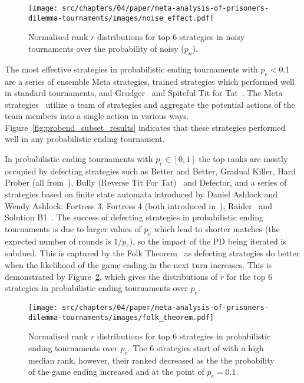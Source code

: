 \begin{figure}[!htbp]
    \centering
    \texttt{[image: src/chapters/04/paper/meta-analysis-of-prisoners-dilemma-tournaments/images/noise\_effect.pdf]}
    \caption{Normalised rank \(r\) distributions for top 6 strategies in noisy tournaments over
    the probability of noisy ($p_n$).}
    \label{fig:effect_of_noise}
\end{figure}

The most effective strategies in probabilistic ending
tournaments with \(p_e< 0.1\) are a series of ensemble Meta strategies, trained strategies
which performed well
in standard tournaments, and Grudger~\cite{axelrodproject} and Spiteful Tit for
Tat~\cite{prison}. The Meta strategies~\cite{axelrodproject} utilize a team of
strategies and aggregate the potential actions of the team members into a single action
in various ways. Figure~\ref{fig:probend_subset_results} indicates that these strategies
performed well in any probabilistic ending tournament.

In probabilistic ending tournaments with \(p_e \in [0, 1]\) the top ranks are
mostly occupied by defecting strategies such as Better and Better, Gradual
Killer, Hard Prober (all from~\cite{axelrodproject}), Bully (Reverse Tit For
Tat)~\cite{Nachbar1992} and Defector, and a series of strategies based on finite
state automata introduced by Daniel Ashlock and Wendy Ashlock: Fortress 3,
Fortress 4 (both introduced in~\cite{Ashlock2006}), Raider~\cite{Ashlock2014}
and Solution B1~\cite{Ashlock2014}. The success of defecting strategies in
probabilistic ending tournaments is due to larger values of
\(p_e\) which lead to shorter matches (the expected number of rounds is \(1 / p_e\)), so the
impact of the PD being iterated is subdued. This is captured by the Folk
Theorem~\cite{Fudenberg2009} as defecting strategies do better when the likelihood
of the game ending in the next turn increases.
This is demonstrated by Figure~\ref{fig:effect_of_probend}, which gives the
distributions of \(r\) for the top 6 strategies in probabilistic ending tournaments
over \(p_e\).

\begin{figure}[!htbp]
    \centering
    \texttt{[image: src/chapters/04/paper/meta-analysis-of-prisoners-dilemma-tournaments/images/folk\_theorem.pdf]}
    \caption{Normalised rank \(r\) distributions for top 6 strategies in probabilistic ending tournaments
    over $p_e$. The 6 strategies start of with a high median rank,
    however, their ranked decreased as the the probability of the game ending
    increased and at the point of \(p_e = 0.1\).}
    \label{fig:effect_of_probend}
\end{figure}

